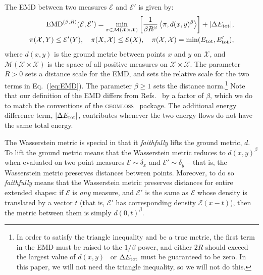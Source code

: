 \documentclass[letterpaper,11pt]{article}
\newcommand{\E}{\mathcal{E}}
\newcommand{\M}{\mathcal{M}}
\newcommand{\EMD}{\text{EMD}}
\DeclareRobustCommand{\Eq}[1]{Eq.~(\ref{eq:#1})}
\DeclareRobustCommand{\Refers}[1]{Refs.~\cite{#1}}
\begin{document}
The EMD between two measures $\E$ and $\E'$ is given by:
%
\begin{align} \label{eq:EMD}
    \EMD^{(\beta,R)}(\E, \E') = \min_{\pi \in \M(\mathcal{X}\times\mathcal{X})}\left[\frac{1}{\beta R^\beta}\expval{\pi, d(x,y)^{\beta}}\right] + |\Delta E_{\rm tot}|, \nonumber \\
    \pi(\mathcal{X}, Y) \leq \E'(Y) , \quad \pi(X, \mathcal{X}) \leq \E(X), \quad \pi(\mathcal{X}, \mathcal{X}) = \min(E_{\rm tot}, E'_{\rm tot}),
\end{align}
%
where $d(x,y)$ is the ground metric between points $x$ and $y$ on $\mathcal{X}$, and $\mathcal{M}(\mathcal{X} \times \mathcal{X})$ is the space of all positive measures on $\mathcal{X} \times \mathcal{X}$. The parameter $R > 0$ sets a distance scale for the EMD, and sets the relative scale for the two terms in \Eq{EMD}. The parameter $\beta \geq 1$ sets the distance norm.\footnote{In order to satisfy the triangle inequality and be a true metric, the first term in the EMD must be raised to the $1/\beta$ power, and either  $2R$ should exceed the largest value of $d(x,y)$~\cite{Komiske_2019,2020} or $\Delta  E_{\rm tot}$ must be guaranteed to be zero. In this paper, we will not need the triangle inequality, so we will not do this.} Note that our definition of the EMD differs from \Refers{Komiske_2019,2020} by a factor of $\beta$, which we do to match the conventions of the \textsc{geomloss}~\cite{feydy2019interpolating} package. The additional energy difference term, $|\Delta E_{\rm tot}| $, contributes whenever the two energy flows do not have the same total energy.


The Wasserstein metric is special in that it \emph{faithfully} lifts the ground metric, $d$. To lift the ground metric means that the Wasserstein metric reduces to $d(x,y)^\beta$ when evaluated on two point measures $\E \sim \delta_x$ and $\E' \sim \delta_y$ -- that is, the Wasserstein metric preserves distances between points. Moreover, to do so \emph{faithfully} means that the Wasserstein metric preserves distances for entire extended shapes: if $\E$ is \emph{any} measure, and $\E'$ is the same as $\E$ whose density is translated by a vector $t$ (that is, $\E'$ has corresponding density $\E(x-t)$), then the metric between them is simply $d(0,t)^\beta$.
\end{document}
